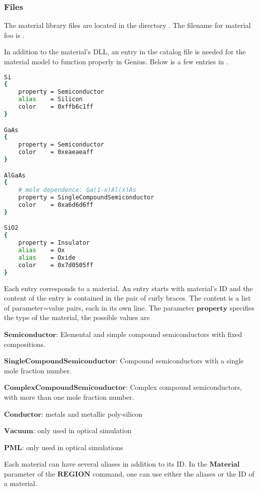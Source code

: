 \documentclass[oneside,12pt]{cgd_book}
\begin{document}
\subsubsection{Files}
The material library files are located in the directory . The
          filename for material {\ttsl foo} is .
\par
{}In addition to the material's DLL, an entry in the catalog file
 is needed for the material model to function properly in
            Genius. Below is a few entries in .
\par
\par
\begin{lstlisting}[language=sh]
Si
{
    property = Semiconductor
    alias    = Silicon
    color    = 0xffb6c1ff
}

GaAs
{
    property = Semiconductor
    color    = 0xeaeaeaff
}

AlGaAs
{
    # mole dependence: Ga(1-x)Al(x)As
    property = SingleCompoundSemiconductor
    color    = 0xa6d6d6ff
}

SiO2
{
    property = Insulator
    alias    = Ox
    alias    = Oxide
    color    = 0x7d0505ff
}

\end{lstlisting}
Each entry corresponds to a material. An entry starts with material's ID and the content of the entry is
          contained in the pair of curly braces. The content is a list of parameter=value pairs, each in its own line.
          The parameter $\mathbf{property}$ specifies the type of the material, the possible values
          are
\par
\begin{compactitem}
\item $\mathbf{Semiconductor}$: Elemental and simple compound semiconductors with fixed
              compositions.
\par
\item $\mathbf{SingleCompoundSemiconductor}$: Compound semiconductors with a single mole
              fraction number.
\par
\item $\mathbf{ComplexCompoundSemiconductor}$: Complex compound semiconductors, with more than
              one mole fraction number.
\par
\item $\mathbf{Conductor}$: metals and metallic poly-silicon
\par
\item $\mathbf{Vacuum}$: only used in optical simulation
\par
\item $\mathbf{PML}$: only used in optical simulations
\par
\end{compactitem}
Each material can have several aliases in addition to its ID. In the
$\mathbf{Material}$ parameter of the $\mathbf{REGION}$ command, one can use either the aliases or the ID of a material.
\par
\end{document}
